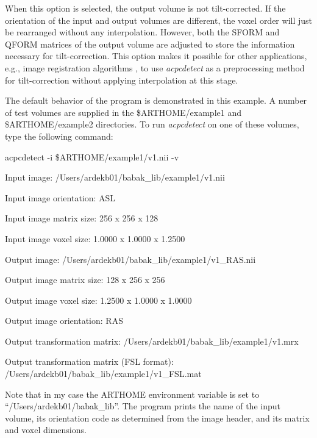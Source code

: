 \documentclass[11pt]{article}
\begin{document}

When this option is selected, the output volume is not tilt-corrected.  If the
orientation of the input and output volumes are different, the voxel 
order will just be rearranged without any interpolation.  However, 
both the SFORM and QFORM matrices of the output volume are adjusted to store
the information necessary for tilt-correction.  This option makes it
possible for other applications, e.g., image registration algorithms \citep{ardekani2018},
to use {\it acpcdetect} as a preprocessing method for tilt-correction
without applying interpolation at this stage. 
\vspace{3mm}

 The default behavior of the program is demonstrated in this example.
A number of test volumes are supplied in the \$ARTHOME/example1 and \$ARTHOME/example2 directories. To run
{\it acpcdetect} on one of these volumes, type the following command:

acpcdetect -i \$ARTHOME/example1/v1.nii -v


Input image: /Users/ardekb01/babak\_lib/example1/v1.nii

Input image orientation: ASL

Input image matrix size: 256 x 256 x 128

Input image voxel size: 1.0000 x 1.0000 x 1.2500

Output image: /Users/ardekb01/babak\_lib/example1/v1\_RAS.nii

Output image matrix size: 128 x 256 x 256

Output image voxel size: 1.2500 x 1.0000 x 1.0000

Output image orientation: RAS

Output transformation matrix: /Users/ardekb01/babak\_lib/example1/v1.mrx

Output transformation matrix (FSL format): /Users/ardekb01/babak\_lib/example1/v1\_FSL.mat 

\noindent
Note that in my case the ARTHOME environment variable is set to 
``/Users/ardekb01/babak\_lib''. 
The program prints the name of the input volume, its orientation code as determined from the image header,
and its matrix and voxel dimensions.  
\end{document}
